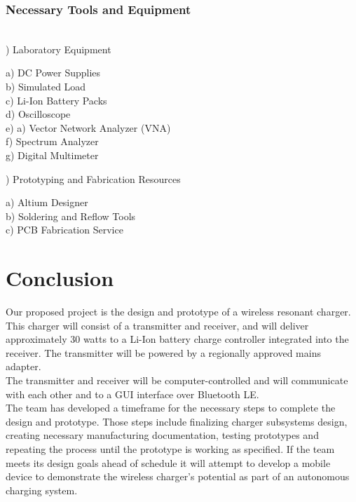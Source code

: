 \documentclass[12pt]{article}
\begin{document}
\subsubsection{Necessary Tools and Equipment}
\hfill \\

) Laboratory Equipment
\begin{addmargin}[0.50cm]{0.75cm}
a) DC Power Supplies\\
b) Simulated Load\\
c) Li-Ion Battery Packs \\
d) Oscilloscope\\
e) a) Vector Network Analyzer (VNA)\\
f) Spectrum Analyzer\\
g) Digital Multimeter 
\end{addmargin}

) Prototyping and Fabrication Resources
\begin{addmargin}[0.50cm]{0.75cm}
a) Altium Designer\\
b) Soldering and Reflow Tools\\
c) PCB Fabrication Service
\end{addmargin}

\pagebreak

\section{Conclusion}

\indent \indent
Our proposed project is the design and prototype of a wireless resonant charger. This charger will consist of a transmitter and receiver, and will deliver approximately 30 watts to a Li-Ion battery charge controller integrated into the receiver. The transmitter will be powered by a regionally approved mains adapter.\\

\indent
The transmitter and receiver will be computer-controlled and will communicate with each other and to a GUI interface over Bluetooth LE.\\

\indent
The team has developed a timeframe for the necessary steps to complete the design and prototype. Those steps include finalizing charger subsystems design, creating necessary manufacturing documentation, testing prototypes and repeating the process until the prototype is working as specified. If the team meets its design goals ahead of schedule it will attempt to develop a mobile device to demonstrate the wireless charger’s potential as part of an autonomous charging system.\\
\end{document}

